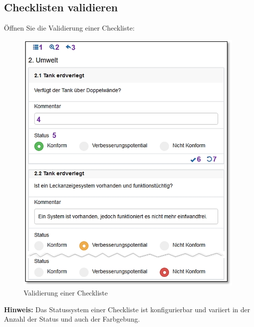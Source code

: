 \pagebreak

\subsection{Checklisten validieren}
\label{bkm:Ref2018102901}

Öffnen Sie die Validierung einer Checkliste:

\begin{figure}   %
  \vspace{-20pt}      %
  \begin{center}
    \includegraphics[width=1\linewidth]{../chapters/06_Checklisten/pictures/ckl_Validierung.jpg}
  \end{center}
  \vspace{-20pt}
  \caption{Validierung einer Checkliste}
  \vspace{-10pt}
\end{figure}

\textbf{Hinweis:} Das Statussystem einer Checkliste ist konfigurierbar und variiert in der Anzahl der Status und auch der Farbgebung.

